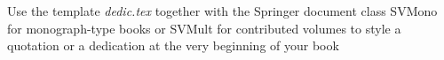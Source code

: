 
%
%
%

\begin{dedication}
  Use the template \emph{dedic.tex} together with the Springer document class SVMono for monograph-type books or SVMult for contributed volumes to style a quotation or a dedication at the very beginning of your book
  \end{dedication}
  
  
  
  
  